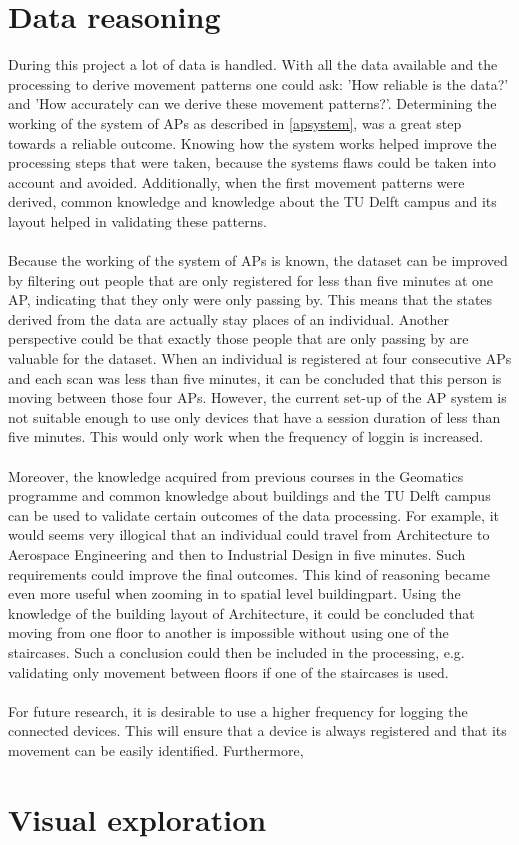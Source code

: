 \section{Data reasoning}
During this project a lot of data is handled. With all the data available and the processing to derive movement patterns one could ask: 'How reliable is the data?' and 'How accurately can we derive these movement patterns?'. Determining the working of the system of APs as described in \autoref{apsystem}, was a great step towards a reliable outcome. Knowing how the system works helped improve the processing steps that were taken, because the systems flaws could be taken into account and avoided. Additionally, when the first movement patterns were derived, common knowledge and knowledge about the TU Delft campus and its layout helped in validating these patterns.\\\\
Because the working of the system of APs is known, the dataset can be improved by filtering out people that are only registered for less than five minutes at one AP, indicating that they only were only passing by. This means that the states derived from the data are actually stay places of an individual. Another perspective could be that exactly those people that are only passing by are valuable for the dataset. When an individual is registered at four consecutive APs and each scan was less than five minutes, it can be concluded that this person is moving between those four APs. However, the current set-up of the AP system is not suitable enough to use only devices that have a session duration of less than five minutes. This would only work when the frequency of loggin is increased.\\\\
Moreover, the knowledge acquired from previous courses in the Geomatics programme and common knowledge about buildings and the TU Delft campus can be used to validate certain outcomes of the data processing. For example, it would seems very illogical that an individual could travel from Architecture to Aerospace Engineering and then to Industrial Design in five minutes. Such requirements could improve the final outcomes. This kind of reasoning became even more useful when zooming in to spatial level buildingpart. Using the knowledge of the building layout of Architecture, it could be concluded that moving from one floor to another is impossible without using one of the staircases. Such a conclusion could then be included in the processing, e.g. validating only movement between floors if one of the staircases is used. \\\\
For future research, it is desirable to use a higher frequency for logging the connected devices. This will ensure that a device is always registered and that its movement can be easily identified. Furthermore, %

\section{Visual exploration}
